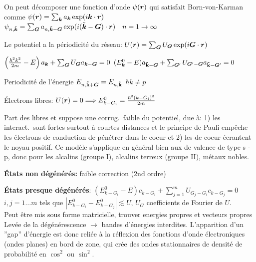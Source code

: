\begin{squishlist}
    \item On peut décomposer une fonction d'onde $\psi(\bm{r})$ qui satisfait Born-von-Karman comme $\psi(\bm{r}) = \sum_{\bm{k}} a_{\bm{k}} \exp(i \bm{k} \cdot \bm{r})$
    \squishsep $\psi_{n,\tilde{\bm{k}}} = \sum_{\bm{G}} a_{n, \tilde{\bm{k}}-\bm{G}} \exp(i (\tilde{\bm{k}} - \bm{G}) \cdot \bm{r}) \quad n=1\rightarrow\infty$
    \item Le potentiel a la périodicité du réseau: $U(\bm{r}) = \sum_{\bm{G}} U_{\bm{G}} \exp(i \bm{G} \cdot \bm{r})$
    \item $\left(\frac{\hbar^2 k^2}{2m} - E\right)a_{\bm{k}} + \sum_{\bm{G}}U_{\bm{G}}a_{\bm{k} - \bm{G}}  = 0$ \qquad $(E_{\bm{k}}^0 - E)a_{\mathbf{{\tilde{k}}} - \bm{G}} + \sum_{\bm{G}'}U_{\bm{G}' - \bm{G}}a_{\mathbf{\tilde{k}} - \bm{G}'}  = 0$
    \item Periodicité de l'énergie $ E_{n,\mathbf{\tilde{k}} + \bm{G}} = E_{n,\mathbf{\tilde{k}}}$ \squishsep $\hbar k \neq p$
    \item Électrons libres: $U(\bm{r}) = 0 \Longrightarrow E_{k - G_i}^0 = \frac{\hbar^2(k - G_i)^2}{2m}$
\end{squishlist}

Part des \elec libres et suppose une corrug.\ faible du potentiel, due à: 
1) les interact.\ sont fortes surtout à courtes distances et le principe de Pauli empêche les électrons de conduction de pénétrer dans le coeur et 
2) les \elec de coeur écrantent le noyau positif. Ce modèle s'applique en général bien aux \elec de valence de type s - p, donc pour les alcalins (groupe I), alcalins terreux (groupe II), métaux nobles.
\begin{squishlist}
    \item \textbf{États non dégénérés:} faible correction (2nd ordre)
    \item \textbf{États presque dégénérés}: $(E_{k-G_i}^0 - E) c_{k-G_i} + \sum_{j=1}^m U_{G_j - G_i} c_{k-G_j} = 0$ \\
    $i,j = 1 \ldots m$ tels que $|E_{k-G_i}^0 - E_{k-G_j}^0| \lesssim U$, \quad $U_G$ coefficients de Fourier de $U$. \\
    Peut être mis sous forme matricielle, trouver energies propres et vecteurs propres \\
    Levée de la dégénérescence $\rightarrow$ bandes d'énergies interdites.
    L’apparition d’un ”gap” d’énergie est donc reliée à la réflexion des fonctions d’onde électroniques (ondes planes) en bord de zone, qui crée des ondes
    stationnaires de densité de probabilité en $\cos^2$ ou $\sin^2$.
\end{squishlist}

